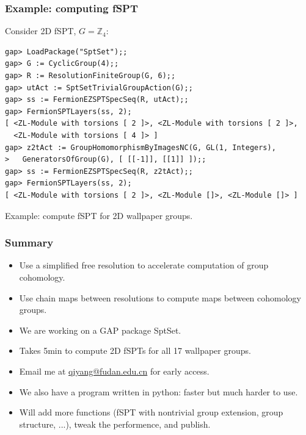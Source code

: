\documentclass[xcolor=table, aspectratio=43,ignorenonframetext]{beamer}
\begin{document}
\begin{frame}[fragile]
	\frametitle{Example: computing fSPT}
	Consider 2D fSPT, $G=\mathbb Z_4$:
\begin{lstlisting}[basicstyle=\footnotesize]
gap> LoadPackage("SptSet");;
gap> G := CyclicGroup(4);;
gap> R := ResolutionFiniteGroup(G, 6);;
gap> utAct := SptSetTrivialGroupAction(G);;
gap> ss := FermionEZSPTSpecSeq(R, utAct);;
gap> FermionSPTLayers(ss, 2);
[ <ZL-Module with torsions [ 2 ]>, <ZL-Module with torsions [ 2 ]>,
  <ZL-Module with torsions [ 4 ]> ]
gap> z2tAct := GroupHomomorphismByImagesNC(G, GL(1, Integers),
>   GeneratorsOfGroup(G), [ [[-1]], [[1]] ]);;
gap> ss := FermionEZSPTSpecSeq(R, z2tAct);;
gap> FermionSPTLayers(ss, 2);
[ <ZL-Module with torsions [ 2 ]>, <ZL-Module []>, <ZL-Module []> ]
\end{lstlisting}

Example: compute fSPT for 2D wallpaper groups.
\end{frame}

\begin{frame}
	\frametitle{Summary}
	\begin{itemize}
		\item Use a simplified free resolution to accelerate computation of group cohomology.
		\item Use chain maps between resolutions to compute maps between cohomology groups.
		\item We are working on a GAP package SptSet.
		\item Takes 5min to compute 2D fSPTs for all 17 wallpaper groups.
		\item Email me at \url{qiyang@fudan.edu.cn} for early access.
		\item We also have a program written in python: faster but much harder to use.
		\item Will add more functions (fSPT with nontrivial group extension, group structure, ...), tweak the performence, and publish.
	\end{itemize}
\end{frame}
\end{document}
